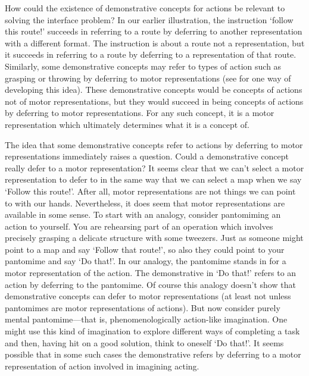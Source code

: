 \documentclass[12pt,\papersize]{extarticle}
\begin{document}
How could the existence of demonstrative concepts for actions be relevant  to solving the interface problem? In our earlier illustration, the instruction `follow this route!' succeeds in referring to a route by deferring to another representation with a different format. The instruction is about a route not a representation, but it succeeds in referring to a route by deferring to a representation of that route. Similarly, some demonstrative concepts may refer to types of action such as grasping or throwing by deferring to motor representations (see \citet{levine:2010_demonstrative} for one way of developing this idea). These demonstrative concepts would be concepts of actions not of motor representations, but they would succeed in being concepts of actions by deferring to motor representations. For any such concept, it is a motor representation which ultimately determines what it is a concept of.

The idea that some demonstrative concepts refer to actions by deferring to motor representations immediately raises a question. Could a demonstrative concept really defer to a motor representation? It seems clear that we can't select a motor representation to defer to in the same way that we can select a map when we say `Follow this route!'. After all, motor representations are not things we can point to with our hands. Nevertheless, it does seem that motor representations are available in some sense. To start with an analogy, consider pantomiming an action to yourself. You are rehearsing part of an operation which involves precisely grasping a delicate structure with some tweezers. Just as someone might point to a map and say `Follow that route!', so also they could point to your pantomime and say `Do that!'. In our analogy, the pantomime stands in for a motor representation of the action.  The demonstrative in `Do that!' refers to an action by deferring to the pantomime. Of course this analogy doesn't show that demonstrative concepts can defer to motor representations (at least not unless pantomimes are motor representations of actions). But now consider purely mental pantomime---that is, phenomenologically action-like imagination. 
One might use this kind of imagination to explore different ways of completing a task and then, having hit on a good solution, think to oneself `Do that!'. 
It seems possible that in some such cases the demonstrative refers by deferring to a motor representation of action involved in imagining acting.
\end{document}

